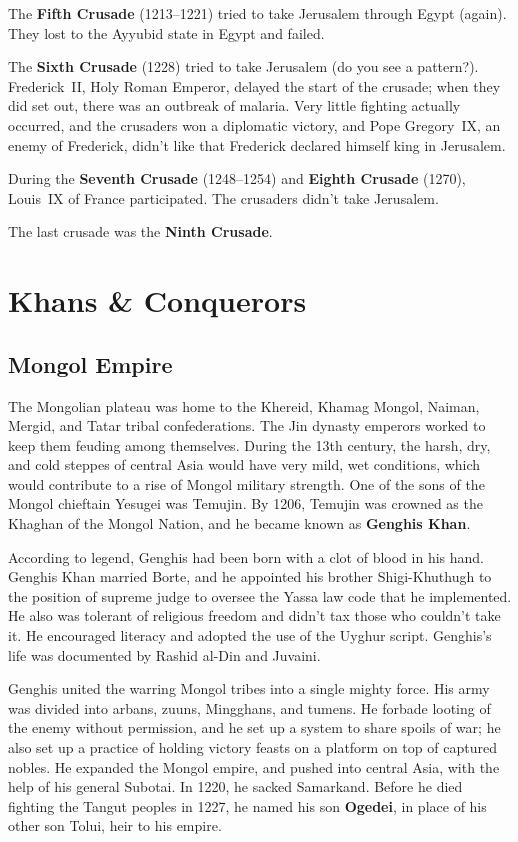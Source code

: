 The \textbf{Fifth Crusade} (1213--1221) tried to take Jerusalem through Egypt (again).
They lost to the Ayyubid state in Egypt and failed.

The \textbf{Sixth Crusade} (1228) tried to take Jerusalem (do you see a pattern?).
Frederick~II, Holy Roman Emperor, delayed the start of the crusade;
when they did set out, there was an outbreak of malaria.
Very little fighting actually occurred, and the crusaders won a diplomatic victory,
and Pope Gregory~IX, an enemy of Frederick, didn't like that Frederick declared himself king in Jerusalem.

During the \textbf{Seventh Crusade} (1248--1254) and \textbf{Eighth Crusade} (1270), Louis~IX of France participated.
The crusaders didn't take Jerusalem.

The last crusade was the \textbf{Ninth Crusade}.

\section{Khans \& Conquerors}

\subsection*{Mongol Empire}

The Mongolian plateau was home to the Khereid, Khamag Mongol, Naiman, Mergid, and Tatar tribal confederations.
The Jin dynasty emperors worked to keep them feuding among themselves.
During the 13th century, the harsh, dry, and cold steppes of central Asia would have very mild, wet conditions,
which would contribute to a rise of Mongol military strength.
One of the sons of the Mongol chieftain Yesugei was Temujin.
By 1206, Temujin was crowned as the Khaghan of the Mongol Nation,
and he became known as \textbf{Genghis Khan}.

According to legend, Genghis had been born with a clot of blood in his hand.
Genghis Khan married Borte,
and he appointed his brother Shigi-Khuthugh to the position of supreme judge
to oversee the Yassa law code that he implemented.
He also was tolerant of religious freedom and didn't tax those who couldn't take it.
He encouraged literacy and adopted the use of the Uyghur script.
Genghis's life was documented by Rashid al-Din and Juvaini.

Genghis united the warring Mongol tribes into a single mighty force.
His army was divided into arbans, zuuns, Mingghans, and tumens.
He forbade looting of the enemy without permission, and he set up a system to share spoils of war;
he also set up a practice of holding victory feasts on a platform on top of captured nobles.
He expanded the Mongol empire, and pushed into central Asia, with the help of his general Subotai.
In 1220, he sacked Samarkand.
Before he died fighting the Tangut peoples in 1227,
he named his son \textbf{Ogedei}, in place of his other son Tolui, heir to his empire.

